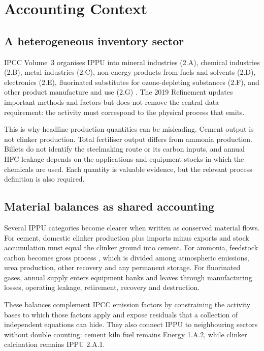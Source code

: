 \section{Accounting Context}
\label{sec:related}

\subsection{A heterogeneous inventory sector}

IPCC Volume~3 organises IPPU into mineral industries (2.A), chemical industries (2.B),
metal industries (2.C), non-energy products from fuels and solvents (2.D), electronics
(2.E), fluorinated substitutes for ozone-depleting substances (2.F), and other product
manufacture and use (2.G) \citep{ipcc2006ippu}. The 2019 Refinement updates important methods
and factors but does not remove the central data requirement: the activity must correspond to
the physical process that emits.

This is why headline production quantities can be misleading. Cement output is not clinker
production. Total fertiliser output differs from ammonia production. Billets do not identify
the steelmaking route or its carbon inputs, and annual HFC leakage depends on the applications
and equipment stocks in which the chemicals are used. Each quantity is valuable evidence, but
the relevant process definition is also required.

\subsection{Material balances as shared accounting}

Several IPPU categories become clearer when written as conserved material flows. For cement,
domestic clinker production plus imports minus exports and stock accumulation must equal the
clinker ground into cement. For ammonia, feedstock carbon becomes gross process \COtwo{}, which
is divided among atmospheric emissions, urea production, other recovery and any permanent
storage. For fluorinated gases, annual supply enters equipment banks and leaves through
manufacturing losses, operating leakage, retirement, recovery and destruction.

These balances complement IPCC emission factors by constraining the activity bases to
which those factors apply and expose residuals that a collection of independent equations can
hide. They also connect IPPU to neighbouring sectors without double counting: cement kiln
fuel remains Energy 1.A.2, while clinker calcination remains IPPU 2.A.1.

